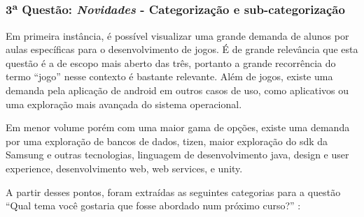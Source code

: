 

\subsubsection*{3\textsuperscript{a} Questão: \textit{Novidades} - Categorização e sub-categorização }

Em primeira instância, é possível visualizar uma grande demanda de alunos por aulas específicas para o desenvolvimento de jogos. É de grande relevância que esta questão é a de escopo mais aberto das três, portanto a grande recorrência do termo \enquote{jogo} nesse contexto é bastante relevante. Além de jogos, existe uma demanda pela aplicação de android em outros casos de uso, como aplicativos ou uma exploração mais avançada do sistema operacional. 

Em menor volume porém com uma maior gama de opções, existe uma demanda por uma exploração de bancos de dados, tizen, maior exploração do sdk da Samsung e outras tecnologias, linguagem de desenvolvimento java, design e user experience, desenvolvimento web, web services, e unity. 

A partir desses pontos, foram extraídas as seguintes categorias para a questão \enquote{Qual tema você gostaria que fosse abordado num próximo curso?} :

